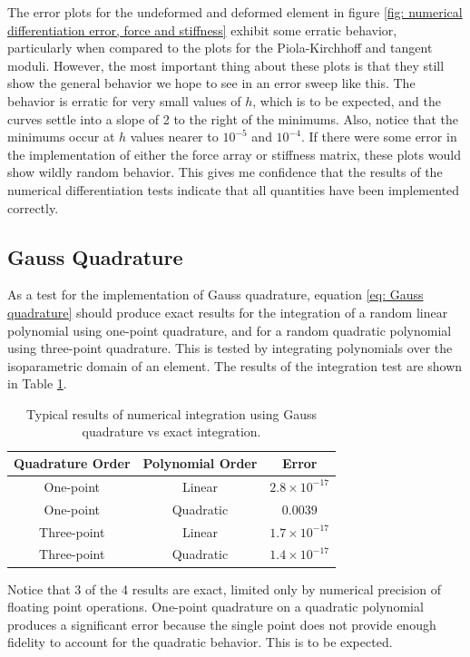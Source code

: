 \documentclass[]{spie}  %
\newcommand\Tstrut{\rule{0pt}{2.6ex}}         %
\begin{document}
The error plots for the undeformed and deformed element in figure \ref{fig: numerical differentiation error, force and stiffness} exhibit some erratic behavior, particularly when compared to the plots for the Piola-Kirchhoff and tangent moduli. However, the most important thing about these plots is that they still show the general behavior we hope to see in an error sweep like this. The behavior is erratic for very small values of $h$, which is to be expected, and the curves settle into a slope of 2 to the right of the minimums. Also, notice that the minimums occur at $h$ values nearer to $10^{-5}$ and $10^{-4}$. If there were some error in the implementation of either the force array or stiffness matrix, these plots would show wildly random behavior. This gives me confidence that the results of the numerical differentiation tests indicate that all quantities have been implemented correctly. 


\subsection{Gauss Quadrature}
As a test for the implementation of Gauss quadrature, equation \ref{eq: Gauss quadrature} should produce exact results for the integration of a random linear polynomial using one-point quadrature, and for a random quadratic polynomial using three-point quadrature. This is tested by integrating polynomials over the isoparametric domain of an element. The results of the integration test are shown in Table \ref{table: gauss quadrature integration}.
\begin{table}[h]
	\centering
	\caption{Typical results of numerical integration using Gauss quadrature vs exact integration.}
	\begin{tabular}{ | c | c | c | }
		\hline
		Quadrature Order & Polynomial Order & Error \Tstrut \\ \hline
		One-point 	& Linear    &  $2.8 \times 10^{-17}$ \Tstrut \\
		One-point 	& Quadratic &  $0.0039$ \\
		Three-point & Linear 	&  $1.7 \times 10^{-17}$ \\
		Three-point & Quadratic &  $1.4 \times 10^{-17}$ \\
		\hline
	\end{tabular}
	\label{table: gauss quadrature integration}
\end{table}

Notice that 3 of the 4 results are exact, limited only by numerical precision of floating point operations. One-point quadrature on a quadratic polynomial produces a significant error because the single point does not provide enough fidelity to account for the quadratic behavior. This is to be expected. 
\end{document}

